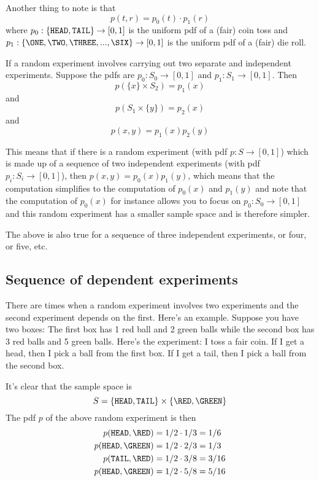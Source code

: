 Another thing to note is that
\[
  p(t, r) = p_0(t) \cdot p_1(r)
\]
where $p_0: \{ \texttt{HEAD}, \texttt{TAIL} \} \rightarrow [0,1]$ is the
uniform pdf of a (fair) coin toss
and $p_1 : \{ \ONE, \TWO, \THREE, ..., \SIX \} \rightarrow [0,1]$
is the uniform pdf of a (fair) die roll.



\begin{thm}
If a random experiment involves
carrying out two separate and independent experiments.
Suppose the pdfs are 
$p_0 : S_0 \rightarrow [0,1]$
and
$p_1 : S_1 \rightarrow [0,1]$.
Then
\[
p(\{x\} \times S_2) = p_1(x)
\]
and
\[
p(S_1 \times \{y\}) = p_2(x)
\]
and
\[
  p(x, y) = p_1(x) p_2(y)
\]
\end{thm}


This means that if there is a random experiment
(with pdf $p : S \rightarrow [0,1]$)
which is made up of a sequence of two independent experiments
(with pdf $p_i : S_i \rightarrow [0,1]$),
then $p(x,y) = p_0(x) p_1(y)$, which means that
the computation simplifies to the computation of
$p_0(x)$ and $p_1(y)$ and note that
the computation of $p_0(x)$ for instance allows you to focus on
$p_0 : S_0 \rightarrow [0,1]$ and this
random
experiment has a smaller sample space and is therefore simpler.

The above is also true for a sequence of three independent
experiments, or four, or five, etc.








\subsection{Sequence of dependent experiments}

There are times when a random experiment involves two experiments
and the second experiment depends on the first.
Here's an example.
Suppose you have two boxes: The first box has 1 red ball and 2 green balls
while the second box has 3 red balls and 5 green balls.
Here's the experiment:
I toss a fair coin.
If I get a head, then I pick a ball from the first box.
If I get a tail, then I pick a ball from the second box.

It's clear that the sample space is
\[
S = \{\HEAD, \TAIL\} \times \{\RED, \GREEN\}
\]
The pdf $p$ of the above random experiment is then
\begin{align*}
  p(\HEAD, \RED) &= 1/2 \cdot 1/3 = 1/6 \\
  p(\HEAD, \GREEN) &= 1/2 \cdot 2/3 = 1/3 \\
  p(\TAIL, \RED) &= 1/2 \cdot 3/8 = 3/16 \\
  p(\HEAD, \GREEN) &= 1/2 \cdot 5/8 = 5/16 
\end{align*}

